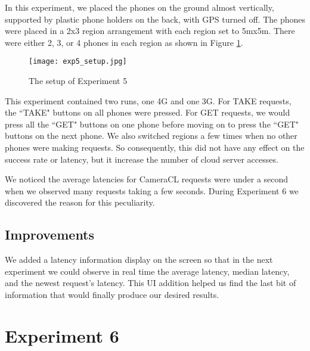 In this experiment, we placed the phones on the ground almost vertically, supported by plastic phone holders on the back, with GPS turned off. The phones were placed in a 2x3 region arrangement with each region set to 5mx5m. There were either 2, 3, or 4 phones in each region as shown in Figure \ref{fig:exp5_setup}.

\begin{figure}[htb]
\begin{center}
\texttt{[image: exp5\_setup.jpg]}
\caption{The setup of Experiment 5}
\label{fig:exp5_setup}
\end{center}
\end{figure}

This experiment contained two runs, one 4G and one 3G. For TAKE requests, the ``TAKE" buttons on all phones were pressed. For GET requests, we would press all the ``GET" buttons on one phone before moving on to press the ``GET" buttons on the next phone. We also switched regions a few times when no other phones were making requests. So consequently, this did not have any effect on the success rate or latency, but it increase the number of cloud server accesses.

We noticed the average latencies for CameraCL requests were under a second when we observed many requests taking a few seconds. During Experiment 6 we discovered the reason for this peculiarity.

\subsection{Improvements}

We added a latency information display on the screen so that in the next experiment we could observe in real time the average latency, median latency, and the newest request's latency. This UI addition helped us find the last bit of information that would finally produce our desired results.

\section{Experiment 6}

